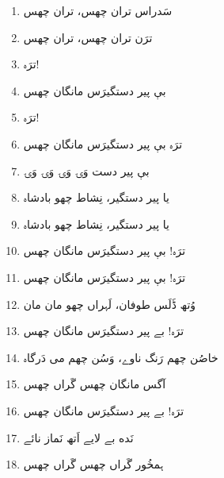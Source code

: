 \documentclass[12pt]{article}
\newcommand{\bigarabic}[1]{\fontsize{16pt}{18pt}\selectfont \textarabic{#1}}
\begin{document}
\begin{multicols}{2}
\begin{RTL}
\begin{enumerate}[leftmargin=*, label=\arabic*., font=\fontsize{16pt}{18pt}\selectfont]
  \item \bigarabic{سَدراس تران چھس، تران چھس}
  \item \bigarabic{ترَن تران چھس، تران چھس}
  \item \bigarabic{ترَہ!}
  \item \bigarabic{بې پیر دستگیرَس مانگان چھس}
  \item \bigarabic{ترَہ!}
  \item \bigarabic{ترَہ بې پیر دستگیرَس مانگان چھس}
  \item \bigarabic{بې پیر دست وَۍ وَۍ وَۍ وَۍ}
  \item \bigarabic{یا پیر دستگیر، نِشاط چھو بادشاہ}
  \item \bigarabic{یا پیر دستگیر، نِشاط چھو بادشاہ}
  \item \bigarabic{ترَہ! بې پیر دستگیرَس مانگان چھس}
  \item \bigarabic{ترَہ! بې پیر دستگیرَس مانگان چھس}
  \item \bigarabic{وُتھ ڈَلَس طوفان، لَہراں چھو مان مان}
  \item \bigarabic{ترَہ! بے پیر دستگیرَس مانگان چھس}
  \item \bigarabic{خاصُن چھم رَنگ ناوے، وَسُن چھم می دَرگاہ}
  \item \bigarabic{آگس مانگان چھس گَراں چھس}
  \item \bigarabic{ترَہ! بے پیر دستگیرَس مانگان چھس}
  \item \bigarabic{نَده بے لایے اَتھ نَماز نائے}
  \item \bigarabic{ہمخُور گَراں چھس گَراں چھس}
\end{enumerate} 
\end{RTL} 
\end{multicols}
\end{document}
